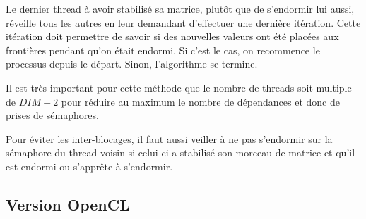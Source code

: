 Le dernier thread à avoir stabilisé sa matrice, plutôt que de
s'endormir lui aussi, réveille tous les autres en leur demandant
d'effectuer une dernière itération. Cette itération doit permettre de
savoir si des nouvelles valeurs ont été placées aux frontières pendant
qu'on était endormi. Si c'est le cas, on recommence le processus
depuis le départ. Sinon, l'algorithme se termine.
\medskip

Il est très important pour cette méthode que le nombre de threads soit
multiple de $DIM-2$ pour réduire au maximum le nombre de dépendances
et donc de prises de sémaphores.
\medskip

Pour éviter les inter-blocages, il faut aussi veiller à ne pas
s'endormir sur la sémaphore du thread voisin si celui-ci a stabilisé
son morceau de matrice et qu'il est endormi ou s'apprête à s'endormir.
\medskip

\subsection{Version OpenCL}

